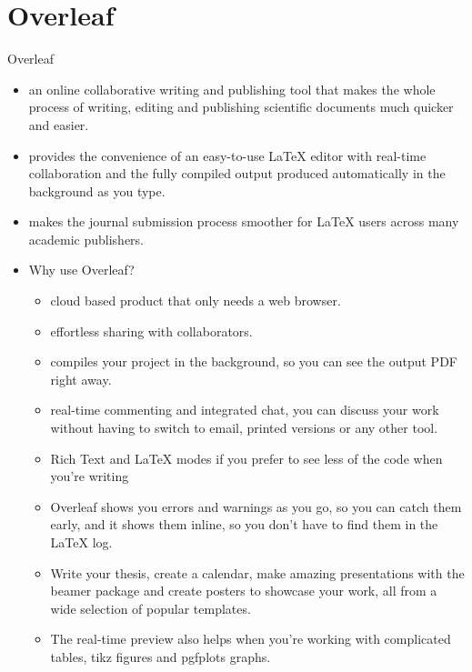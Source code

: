 \documentclass[style=lehigh,orient=landscape]{powerdot}
\begin{document}
\section[slide=false]{Overleaf}
\begin{wideslide}{Overleaf}
 \begin{itemize}
  \item an online collaborative writing and publishing tool that makes the whole process of writing, editing and publishing scientific documents much quicker and easier. 
  \item provides the convenience of an easy-to-use \LaTeX{} editor with real-time collaboration and the fully compiled output produced automatically in the background as you type.
  \item makes the journal submission process smoother for \LaTeX{} users across many academic publishers.
   \item Why use Overleaf?
\begin{itemize}
    \item cloud based product that only needs a web browser.
    \item effortless sharing with collaborators.
    \item compiles your project in the background, so you can see the output PDF right away.
    \item real-time commenting and integrated chat, you can discuss your work without having to switch to email, printed versions or any other tool. 
    \item Rich Text and \LaTeX{} modes if you prefer to see less of the code when you’re writing
    \item Overleaf shows you errors and warnings as you go, so you can catch them early, and it shows them inline, so you don't have to find them in the \LaTeX{} log.
    \item Write your thesis, create a calendar, make amazing presentations with the beamer package and create posters to showcase your work, all from a wide selection of popular templates. 
    \item The real-time preview also helps when you're working with complicated tables, tikz figures and pgfplots graphs.
\end{itemize}
\end{itemize}
\end{wideslide}
\end{document}
